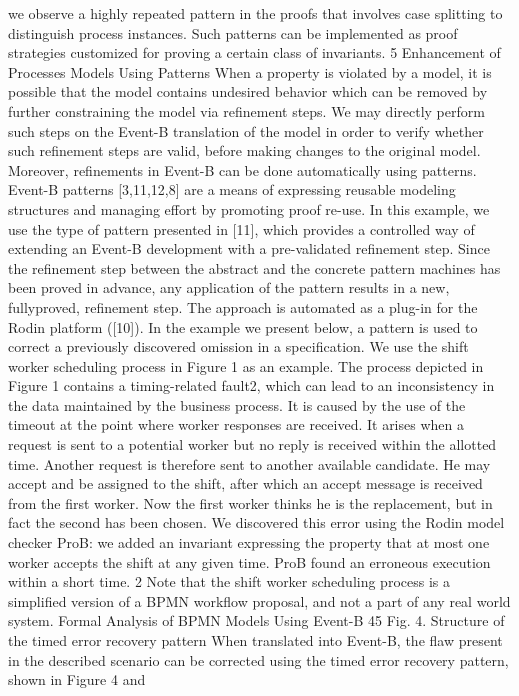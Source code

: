 we observe a highly repeated pattern in the proofs that involves case splitting
to distinguish process instances. Such patterns can be implemented as proof
strategies customized for proving a certain class of invariants.
5 Enhancement of Processes Models Using Patterns
When a property is violated by a model, it is possible that the model contains
undesired behavior which can be removed by further constraining the model via
refinement steps. We may directly perform such steps on the Event-B translation
of the model in order to verify whether such refinement steps are valid, before
making changes to the original model. Moreover, refinements in Event-B can be
done automatically using patterns.
Event-B patterns [3,11,12,8] are a means of expressing reusable modeling
structures and managing effort by promoting proof re-use. In this example, we
use the type of pattern presented in [11], which provides a controlled way of
extending an Event-B development with a pre-validated refinement step. Since
the refinement step between the abstract and the concrete pattern machines has
been proved in advance, any application of the pattern results in a new, fullyproved, refinement step. The approach is automated as a plug-in for the Rodin
platform ([10]). In the example we present below, a pattern is used to correct a
previously discovered omission in a specification.
We use the shift worker scheduling process in Figure 1 as an example. The
process depicted in Figure 1 contains a timing-related fault2, which can lead to
an inconsistency in the data maintained by the business process. It is caused by
the use of the timeout at the point where worker responses are received. It arises
when a request is sent to a potential worker but no reply is received within the
allotted time. Another request is therefore sent to another available candidate.
He may accept and be assigned to the shift, after which an accept message is
received from the first worker. Now the first worker thinks he is the replacement,
but in fact the second has been chosen. We discovered this error using the Rodin
model checker ProB: we added an invariant expressing the property that at
most one worker accepts the shift at any given time. ProB found an erroneous
execution within a short time.
2 Note that the shift worker scheduling process is a simplified version of a BPMN
workflow proposal, and not a part of any real world system.
Formal Analysis of BPMN Models Using Event-B 45
Fig. 4. Structure of the timed error recovery pattern
When translated into Event-B, the flaw present in the described scenario can
be corrected using the timed error recovery pattern, shown in Figure 4 and
